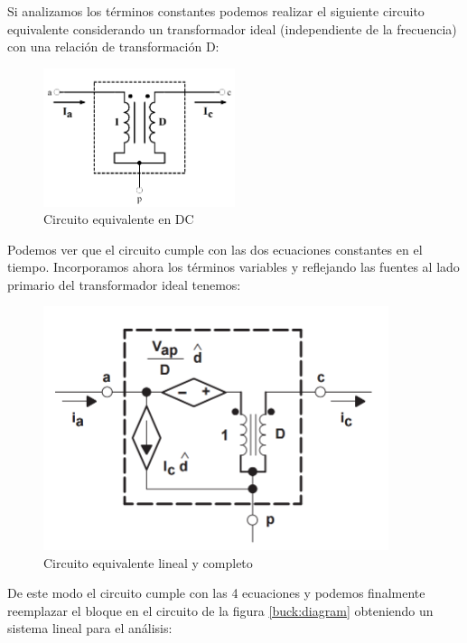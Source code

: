 \documentclass[12pt]{report}
\begin{document}
	Si analizamos los términos constantes podemos realizar el siguiente circuito equivalente considerando un transformador ideal (independiente de la frecuencia) con una relación de transformación D:
	
	\begin{figure}[H]
		\centering
		\includegraphics[width=0.5\textwidth,height=\textheight,keepaspectratio]{buck_control_dc_equivalent}
		\caption{Circuito equivalente en DC}
	\end{figure}

	Podemos ver que el circuito cumple con las dos ecuaciones constantes en el tiempo. Incorporamos ahora los términos variables y reflejando las fuentes al lado primario del transformador ideal tenemos:
	
	\begin{figure}[H]
		\centering
		\includegraphics[width=0.9\textwidth,height=\textheight,keepaspectratio]{buck_control_dc_ac_equivalent}
		\caption{Circuito equivalente lineal y completo}
	\end{figure}

	De este modo el circuito cumple con las 4 ecuaciones y podemos finalmente reemplazar el bloque en el circuito de la figura \ref{buck:diagram} obteniendo un sistema lineal para el análisis:
	
\end{document}
